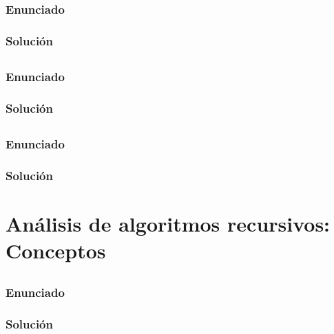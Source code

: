 \subsubsection{Enunciado}

\subsubsection{Solución}

\subsection{}\label{ej1-1-39}

\subsubsection{Enunciado}

\subsubsection{Solución}

\subsection{}\label{ej1-1-40}

\subsubsection{Enunciado}

\subsubsection{Solución}

\section{Análisis de algoritmos recursivos: Conceptos}

\subsection{}\label{ej1-1-41}

\subsubsection{Enunciado}

\subsubsection{Solución}

